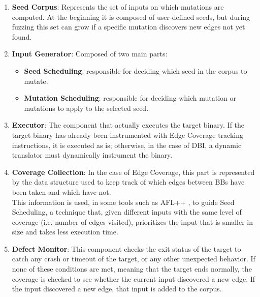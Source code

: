     \begin{enumerate}
        \item \textbf{Seed Corpus}: Represents the set of inputs on which mutations are computed.
            At the beginning it is composed of user-defined seeds, but during fuzzing this set can grow if a specific mutation discovers new edges not yet found.
        \item \textbf{Input Generator}: Composed of two main parts:
            \begin{itemize}
                \item \small \textbf{Seed Scheduling}: responsible for deciding which seed in the corpus to mutate.
                \item \small \textbf{Mutation Scheduling}: responsible for deciding which mutation or mutations to apply to the selected seed.
            \end{itemize}
        \item \textbf{Executor}: The component that actually executes the target binary.
            If the target binary has already been instrumented with Edge Coverage tracking instructions, it is executed as is;
            otherwise, in the case of \gls{DBI}, a dynamic translator must dynamically instrument the binary.
        \item \textbf{Coverage Collection}: In the case of Edge Coverage, this part is represented by the data structure used
            to keep track of which edges between \gls{BB}s have been taken and which have not.\\
            This information is used, in some tools such as AFL++ \cite{aflplusplus}, to guide Seed Scheduling,
            a technique that, given different inputs with the same level of coverage (i.e. number of edges visited),
            prioritizes the input that is smaller in size and takes less execution time.
        \item \textbf{Defect Monitor}: This component checks the exit status of the target to catch any crash or
            timeout of the target, or any other unexpected behavior.
            If none of these conditions are met, meaning that the target ends normally, the coverage is checked
            to see whether the current input discovered a new edge.
            If the input discovered a new edge, that input is added to the corpus.
        \end{enumerate}

